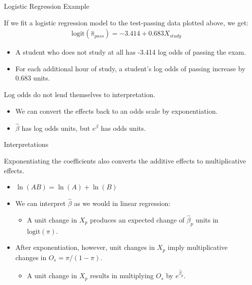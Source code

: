 \documentclass{beamer}\usepackage[]{graphicx}\usepackage[]{color}
\begin{document}
\begin{frame}{Logistic Regression Example}
  


If we fit a logistic regression model to the test-passing data plotted above, we 
get:
\begin{align*}
  \text{logit}(\hat{\pi}_{pass}) = -3.414 + 0.683 X_{study}
\end{align*}
\begin{itemize}
\item A student who does not study at all has -3.414 log odds of passing the
  exam.  
\item For each additional hour of study, a student's log odds of passing increase
  by 0.683 units.
\end{itemize}
\vb
Log odds do not lend themselves to interpretation.
\begin{itemize}
\item We can convert the effects back to an odds scale by exponentiation.
\item $\hat{\beta}$ has log odds units, but $e^{\hat{\beta}}$ has odds units.
\end{itemize}

\end{frame}


\begin{frame}{Interpretations} 
 
  Exponentiating the coefficients also converts the additive effects to 
  multiplicative effects.
  \vc
  \begin{itemize}
  \item $\ln(AB) = \ln(A) + \ln(B)$
  \item We can interpret $\hat{\beta}$ as we would in linear regression:
    \begin{itemize}
    \item A unit change in $X_p$ produces an expected change of $\hat{\beta}_p$ 
      units in $\text{logit}(\pi)$.
    \end{itemize}
    \vc
  \item After exponentiation, however, unit changes in $X_p$ imply multiplicative 
    changes in $O_s = \pi / (1 - \pi)$.
    \begin{itemize}
    \item A unit change in $X_p$ results in multiplying $O_s$  by 
      $e^{\hat{\beta}_p}$.
    \end{itemize}
  \end{itemize}
  
\end{frame}
\end{document}
